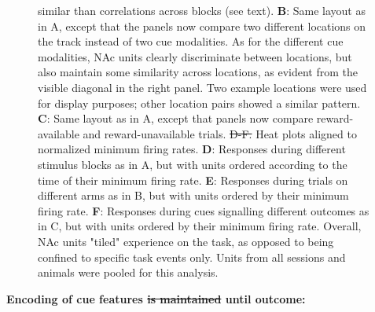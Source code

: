\documentclass[11pt]{article}
\newcommand{\bsf}[1]{\textbf{#1}}
\providecommand{\DIFadd}[1]{{\protect\color{blue}\uwave{#1}}} %
\providecommand{\DIFdel}[1]{{\protect\color{red}\sout{#1}}}                      %
\providecommand{\DIFaddbegin}{} %
\providecommand{\DIFaddend}{} %
\providecommand{\DIFdelbegin}{} %
\providecommand{\DIFdelend}{} %
\providecommand{\DIFaddFL}[1]{\DIFadd{#1}} %
\providecommand{\DIFdelFL}[1]{\DIFdel{#1}} %
\providecommand{\DIFaddbeginFL}{} %
\providecommand{\DIFaddendFL}{} %
\providecommand{\DIFdelbeginFL}{} %
\providecommand{\DIFdelendFL}{} %
\newcommand{\DIFscaledelfig}{0.5}
\newlength{\DIFdelgraphicswidth} %
\newlength{\DIFdelgraphicsheight} %
\newcommand{\DIFaddincludegraphics}[2][]{{\color{blue}\fbox{\DIFOincludegraphics[#1]{#2}}}} %
\newcommand{\DIFdelincludegraphics}[2][]{%
\sbox{\DIFdelgraphicsbox}{\DIFOincludegraphics[#1]{#2}}%
\settoboxwidth{\DIFdelgraphicswidth}{\DIFdelgraphicsbox} %
\settoboxtotalheight{\DIFdelgraphicsheight}{\DIFdelgraphicsbox} %
\scalebox{\DIFscaledelfig}{%
\parbox[b]{\DIFdelgraphicswidth}{\usebox{\DIFdelgraphicsbox}\\[-\baselineskip] \rule{\DIFdelgraphicswidth}{0em}}\llap{\resizebox{\DIFdelgraphicswidth}{\DIFdelgraphicsheight}{%
\setlength{\unitlength}{\DIFdelgraphicswidth}%
\begin{picture}(1,1)%
\thicklines\linethickness{2pt} %
{\color[rgb]{1,0,0}\put(0,0){\framebox(1,1){}}}%
{\color[rgb]{1,0,0}\put(0,0){\line( 1,1){1}}}%
{\color[rgb]{1,0,0}\put(0,1){\line(1,-1){1}}}%
\end{picture}%
}\hspace*{3pt}}} %
} %
\DeclareRobustCommand{\DIFaddbegin}{\DIFOaddbegin \let\includegraphics\DIFaddincludegraphics} %
\DeclareRobustCommand{\DIFaddend}{\DIFOaddend \let\includegraphics\DIFOincludegraphics} %
\DeclareRobustCommand{\DIFdelbegin}{\DIFOdelbegin \let\includegraphics\DIFdelincludegraphics} %
\DeclareRobustCommand{\DIFdelend}{\DIFOaddend \let\includegraphics\DIFOincludegraphics} %
\DeclareRobustCommand{\DIFaddbeginFL}{\DIFOaddbeginFL \let\includegraphics\DIFaddincludegraphics} %
\DeclareRobustCommand{\DIFaddendFL}{\DIFOaddendFL \let\includegraphics\DIFOincludegraphics} %
\DeclareRobustCommand{\DIFdelbeginFL}{\DIFOdelbeginFL \let\includegraphics\DIFdelincludegraphics} %
\DeclareRobustCommand{\DIFdelendFL}{\DIFOaddendFL \let\includegraphics\DIFOincludegraphics} %
\begin{document}
{\begin{figure}[h]
{similar than correlations across blocks (see text). \bsf{B}: Same layout as in
A, except that the panels now compare two different locations on the track
instead of two cue modalities. As for the different cue modalities, NAc units
clearly discriminate between locations, but also maintain some similarity
across locations, as evident from the visible diagonal in the right panel. Two
example locations were used for display purposes; other location pairs showed
a similar pattern. \bsf{C}: Same layout as in A, except that panels now
compare reward-available and reward-unavailable trials. \DIFdelbeginFL \DIFdelFL{D-F. }\DIFdelendFL \DIFaddbeginFL \DIFaddFL{\bsf{D-F}: }\DIFaddendFL Heat plots
aligned to normalized minimum firing rates. \bsf{D}: Responses during
different stimulus blocks as in A, but with units ordered according to the
time of their minimum firing rate. \bsf{E}: Responses during trials on
different arms as in B, but with units ordered by their minimum firing
rate. \bsf{F}: Responses during cues signalling different outcomes as in C,
but with units ordered by their minimum firing rate. Overall, NAc units
"tiled" experience on the task, as opposed to being confined to specific task
events only. Units from all sessions and animals were pooled for this
analysis.}
\label{fig:tiling}
\end{figure}
{\bf Encoding of cue features \DIFdelbegin \DIFdel{is maintained }\DIFdelend \DIFaddbegin \DIFadd{persists }\DIFaddend until outcome:}

}
\end{document}
